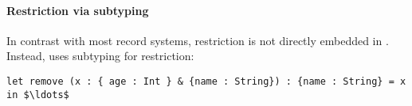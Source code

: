 \begin{comment}
\paragraph{Record terms and types}
Our system directly encodes a term for the single record construct $\recordCon l e$, where $l$ is some
label and $e$ is some other term.
This term comes with its associated type, denoted as $\recordType l T$, where $T$ is a type that is attributed 
to $e$. 

\paragraph{Selection}
The select operator is directly embedded in our language. 
It follows the usual syntax of $e.l$, where $e$ is an expression of type $\recordType l \alpha$ and 
$l$ is a label.
A polymorphic function which extracts any record that include the label $l$ of type
$\alpha$ could be written as:

\begin{lstlisting}[mathescape=true]
let select A (r : {l : A}) : A = r.l in $\ldots$ 
\end{lstlisting}

Note how, through the use of subtyping, this function will accept any intersection type that 
contains the single record $\recordType l A$.
This may resemble other systems with subtyping \cite{cardelli1990operations,pierce1994simple}, 
although it is slightly more general -- the type $A$ is not restricted only  
restricted to record types. 
\end{comment}

\paragraph{Restriction via subtyping}
In contrast with most record systems, restriction is not directly
embedded in \name.
Instead, \name uses subtyping for restriction: 
%
\begin{lstlisting}[mathescape=true]
let remove (x : { age : Int } & {name : String}) : {name : String} = x in $\ldots$ 
\end{lstlisting}

